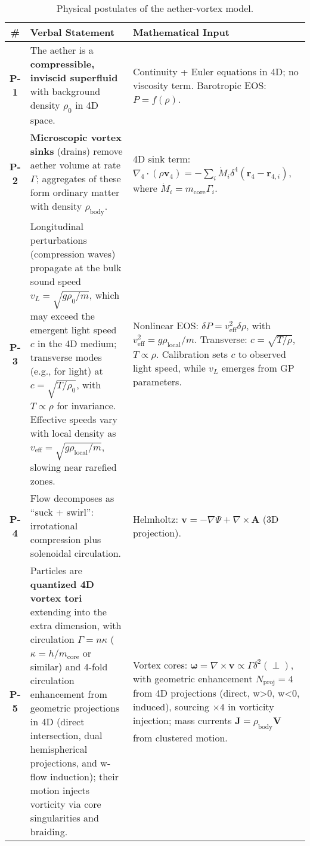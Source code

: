 \documentclass{article}
\begin{document}
\begin{table}[h!]
\centering
\begin{tabularx}{\textwidth}{|c|Y|Y|}
\hline
\# & Verbal Statement & Mathematical Input \\
\hline
\textbf{P-1} & The aether is a \textbf{compressible, inviscid superfluid} with background density $\rho_0$ in 4D space. & Continuity + Euler equations in 4D; no viscosity term. Barotropic EOS: $P = f(\rho)$. \\
\hline
\textbf{P-2} & \textbf{Microscopic vortex sinks} (drains) remove aether volume at rate $\Gamma$; aggregates of these form ordinary matter with density $\rho_{\text{body}}$. & 4D sink term: $\nabla_4 \cdot (\rho \mathbf{v}_4) = -\sum_i \dot{M}_i \delta^4(\mathbf{r}_4 - \mathbf{r}_{4,i})$, where $\dot{M}_i = m_{\text{core}} \Gamma_i$. \\
\hline
\textbf{P-3} & Longitudinal perturbations (compression waves) propagate at the bulk sound speed $v_L = \sqrt{g \rho_0 / m}$, which may exceed the emergent light speed $c$ in the 4D medium; transverse modes (e.g., for light) at $c = \sqrt{T / \rho_0}$, with $T \propto \rho$ for invariance. Effective speeds vary with local density as $v_{\text{eff}} = \sqrt{g \rho_{\text{local}} / m}$, slowing near rarefied zones. & Nonlinear EOS: $\delta P = v_{\text{eff}}^2 \delta \rho$, with $v_{\text{eff}}^2 = g \rho_{\text{local}} / m$. Transverse: $c = \sqrt{T / \rho}$, $T \propto \rho$. Calibration sets $c$ to observed light speed, while $v_L$ emerges from GP parameters. \\
\hline
\textbf{P-4} & Flow decomposes as ``suck + swirl'': irrotational compression plus solenoidal circulation. & Helmholtz: $\mathbf{v} = -\nabla \Psi + \nabla \times \mathbf{A}$ (3D projection). \\
\hline
\textbf{P-5} & Particles are \textbf{quantized 4D vortex tori} extending into the extra dimension, with circulation $\Gamma = n \kappa$ ($\kappa = h / m_{\text{core}}$ or similar) and 4-fold circulation enhancement from geometric projections in 4D (direct intersection, dual hemispherical projections, and w-flow induction); their motion injects vorticity via core singularities and braiding. & Vortex cores: $\boldsymbol{\omega} = \nabla \times \mathbf{v} \propto \Gamma \delta^2(\perp)$, with geometric enhancement $N_{\text{proj}}=4$ from 4D projections (direct, w>0, w<0, induced), sourcing $\times 4$ in vorticity injection; mass currents $\mathbf{J} = \rho_{\text{body}} \mathbf{V}$ from clustered motion. \\
\hline
\end{tabularx}
\caption{Physical postulates of the aether-vortex model.\protect\footnotemark}
\label{tab:postulates}
\end{table}
\end{document}
